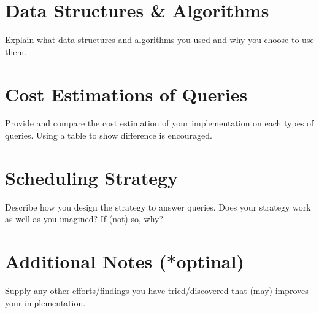 \documentclass{article}
\begin{document}
\section{Data Structures \& Algorithms}
Explain what data structures and algorithms you used and why you choose to use them.

\section{Cost Estimations of Queries}
Provide and compare the cost estimation of your implementation on each types of queries. Using a table to show difference is encouraged.

\section{Scheduling Strategy}
Describe how you design the strategy to answer queries. Does your strategy work as well as you imagined? If (not) so, why?

\section{Additional Notes (*optinal)}
Supply any other efforts/findings you have tried/discovered that (may) improves your implementation.
\end{document}
